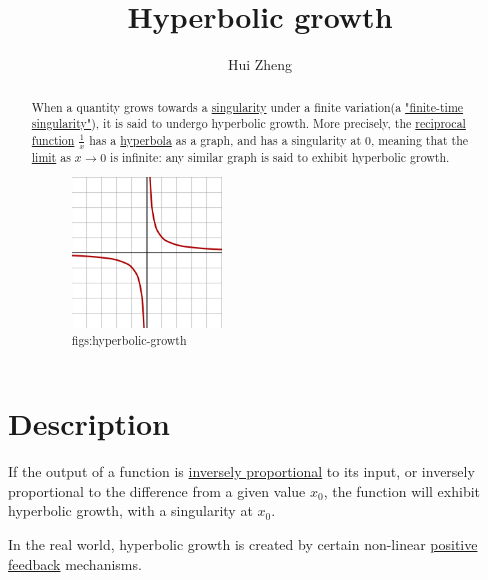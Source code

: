 \documentclass[lang=cn,11pt,a4paper,cite=numbers]{elegantpaper}
\title{Hyperbolic growth}
\author{Hui Zheng}
\date{\zhtoday}
\begin{document}
\maketitle

\begin{abstract}
When a quantity grows towards a \href{https://en.wikipedia.org/wiki/Mathematical_singularity}{singularity} under a finite variation(a \href{https://en.wikipedia.org/wiki/Finite-time_singularity}{"finite-time singularity"}), it is said to undergo hyperbolic growth\cite{korotaev2006introduction}. More precisely, the \href{https://en.wikipedia.org/wiki/Reciprocal_function}{reciprocal function} $\frac{1}{x}$ has a \href{https://en.wikipedia.org/wiki/Hyperbola}{hyperbola} as a graph, and has a singularity at 0, meaning that the \href{https://en.wikipedia.org/wiki/Limit_of_a_function}{limit} as $x{\to}0$ is infinite: any similar graph is said to exhibit hyperbolic growth.
\begin{figure}[!htb]
  \centering
  \includegraphics[width=0.4\textwidth]{figs/hyperbolic-growth.png}
  \caption{figs:hyperbolic-growth}
  \label{figs:hyperbolic-growth}
\end{figure}
\end{abstract}

\section{Description}
  If the output of a function is \href{https://en.wikipedia.org/wiki/Inversely_proportional}{inversely proportional} to its input, or inversely proportional to the difference from a given value $x_{0}$, the function will exhibit hyperbolic growth, with a singularity at $x_{0}$.

  In the real world, hyperbolic growth is created by certain non-linear \href{https://en.wikipedia.org/wiki/Positive_feedback}{positive feedback} mechanisms\cite{markov2007phanerozoic}.
\end{document}
